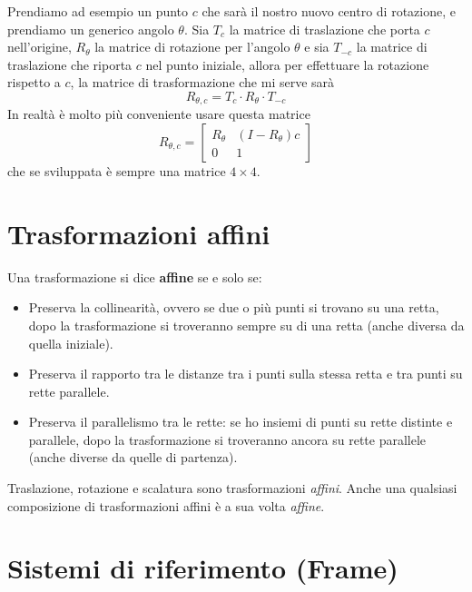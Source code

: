 Prendiamo ad esempio un punto $c$ che sar\`a il nostro nuovo centro di rotazione, e prendiamo
un generico angolo $\theta$. Sia $T_c$ la matrice di traslazione che porta $c$ nell'origine,
$R_\theta$ la matrice di rotazione per l'angolo $\theta$ e sia $T_{-c}$ la matrice di
traslazione che riporta $c$ nel punto iniziale, allora per effettuare la rotazione rispetto
a $c$, la matrice di trasformazione che mi serve sar\`a
\[ R_{\theta, c} = T_c \cdot R_\theta \cdot T_{-c} \]
In realt\`a \`e molto pi\`u conveniente usare questa matrice
\[
	R_{\theta, c} = \begin{bmatrix}
		R_\theta & (I - R_\theta) c \\
		0        & 1
	\end{bmatrix}
\]
che se sviluppata \`e sempre una matrice $4 \times 4$.

\section{Trasformazioni affini}
Una trasformazione si dice \textbf{affine} se e solo se:
\begin{itemize}
	\item Preserva la collinearit\`a, ovvero se due o pi\`u punti si trovano su una retta,
	      dopo la trasformazione si troveranno sempre su di una retta (anche diversa da
	      quella iniziale).
	\item Preserva il rapporto tra le distanze tra i punti sulla stessa retta e tra punti su
	      rette parallele.
	\item Preserva il parallelismo tra le rette: se ho insiemi di punti su rette distinte e
	      parallele, dopo la trasformazione si troveranno ancora su rette parallele (anche
	      diverse da quelle di partenza).
\end{itemize}
Traslazione, rotazione e scalatura sono trasformazioni \emph{affini}. Anche una qualsiasi
composizione di trasformazioni affini \`e a sua volta \emph{affine}.

\section{Sistemi di riferimento (Frame)}
